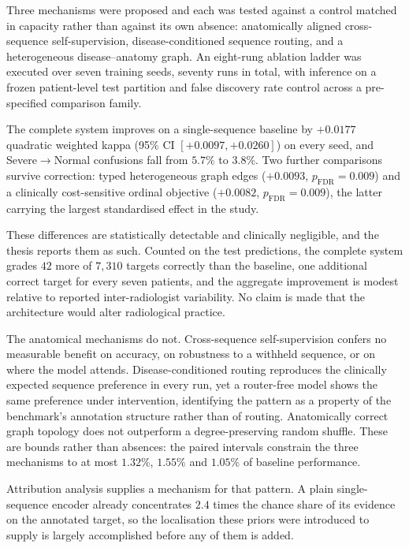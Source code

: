 Three mechanisms were proposed and each was tested against a control matched in
capacity rather than against its own absence: anatomically aligned cross-sequence
self-supervision, disease-conditioned sequence routing, and a heterogeneous
disease--anatomy graph. An eight-rung ablation ladder was executed over seven
training seeds, seventy runs in total, with inference on a frozen patient-level
test partition and false discovery rate control across a pre-specified
comparison family.

The complete system improves on a single-sequence baseline by $+0.0177$
quadratic weighted kappa (95\% CI $[+0.0097, +0.0260]$) on every seed, and
Severe$\rightarrow$Normal confusions fall from $5.7\%$ to $3.8\%$. Two further
comparisons survive correction: typed heterogeneous graph edges
($+0.0093$, $p_{\mathrm{FDR}} = 0.009$) and a clinically cost-sensitive ordinal
objective ($+0.0082$, $p_{\mathrm{FDR}} = 0.009$), the latter carrying the
largest standardised effect in the study.

These differences are statistically detectable and clinically negligible, and
the thesis reports them as such. Counted on the test predictions, the complete
system grades $42$ more of $7{,}310$ targets correctly than the baseline, one
additional correct target for every seven patients, and the aggregate
improvement is modest relative to reported inter-radiologist variability. No
claim is made that the architecture would alter radiological practice.

The anatomical mechanisms do not. Cross-sequence self-supervision confers no
measurable benefit on accuracy, on robustness to a withheld sequence, or on
where the model attends. Disease-conditioned routing reproduces the clinically
expected sequence preference in every run, yet a router-free model shows the
same preference under intervention, identifying the pattern as a property of the
benchmark's annotation structure rather than of routing. Anatomically correct
graph topology does not outperform a degree-preserving random shuffle. These are
bounds rather than absences: the paired intervals constrain the three mechanisms
to at most $1.32\%$, $1.55\%$ and $1.05\%$ of baseline performance.

Attribution analysis supplies a mechanism for that pattern. A plain
single-sequence encoder already concentrates $2.4$ times the chance share of its
evidence on the annotated target, so the localisation these priors were
introduced to supply is largely accomplished before any of them is added.

